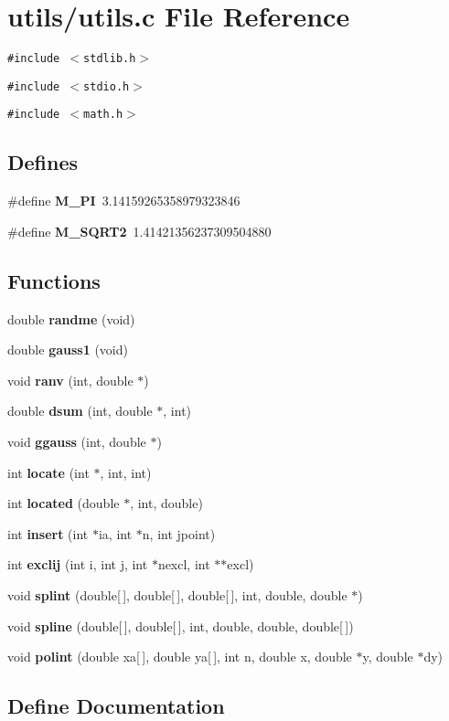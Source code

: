 \section{utils/utils.c File Reference}
\label{utils_8c}
{\tt \#include $<$stdlib.h$>$}\par
{\tt \#include $<$stdio.h$>$}\par
{\tt \#include $<$math.h$>$}\par
\subsection*{Defines}
\begin{CompactItemize}
\item 
\#define {\bf M\_\-PI}~3.14159265358979323846
\item 
\#define {\bf M\_\-SQRT2}~1.41421356237309504880
\end{CompactItemize}
\subsection*{Functions}
\begin{CompactItemize}
\item 
double {\bf randme} (void)
\item 
double {\bf gauss1} (void)
\item 
void {\bf ranv} (int, double $\ast$)
\item 
double {\bf dsum} (int, double $\ast$, int)
\item 
void {\bf ggauss} (int, double $\ast$)
\item 
int {\bf locate} (int $\ast$, int, int)
\item 
int {\bf located} (double $\ast$, int, double)
\item 
int {\bf insert} (int $\ast$ia, int $\ast$n, int jpoint)
\item 
int {\bf exclij} (int i, int j, int $\ast$nexcl, int $\ast$$\ast$excl)
\item 
void {\bf splint} (double[$\,$], double[$\,$], double[$\,$], int, double, double $\ast$)
\item 
void {\bf spline} (double[$\,$], double[$\,$], int, double, double, double[$\,$])
\item 
void {\bf polint} (double xa[$\,$], double ya[$\,$], int n, double x, double $\ast$y, double $\ast$dy)
\end{CompactItemize}


\subsection{Define Documentation}
